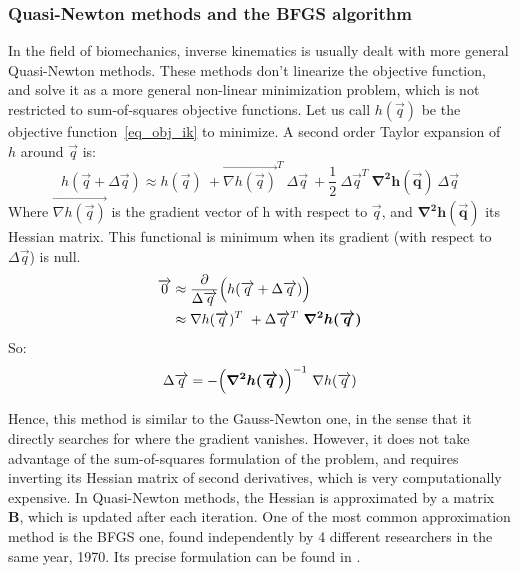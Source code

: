 \subsubsection{Quasi-Newton methods and the BFGS algorithm}

In the field of biomechanics, inverse kinematics is usually dealt with more general Quasi-Newton methods. These methods don't linearize the objective function, and solve it as a more general non-linear minimization problem, which is not restricted to sum-of-squares objective functions. 
Let us call $h(\overrightarrow{q})$ be the objective function~\ref{eq_obj_ik} to minimize. A second order Taylor expansion of $h$ around $\overrightarrow{q}$ is:
\begin{equation}
      h(\overrightarrow{q}+\Delta\overrightarrow{q}) 
      \approx h(\overrightarrow{q}) \ 
      + \overrightarrow{\nabla h(\overrightarrow{q})}^T  \ \Delta\overrightarrow{q} \ 
      + \frac{1}{2}  \ \Delta\overrightarrow{q}^T \ \bm{\nabla^2 h(\overrightarrow{q})}  \ \Delta\overrightarrow{q}
\end{equation} 
Where $\overrightarrow{\nabla h(\overrightarrow{q})}$ is the gradient vector of h with respect to $\overrightarrow{q}$, and $\bm{\nabla^2 h(\overrightarrow{q})}$ its Hessian matrix. This functional is minimum when its gradient (with respect to $\Delta\overrightarrow{q}$) is null.
\begin{equation}
    \begin{aligned}
      \overrightarrow{0} &\approx 
      \frac{\partial}{\Delta \overrightarrow{q}}
      \Bigl( h(\overrightarrow{q}+\Delta\overrightarrow{q}) \Bigr) \\
      &\approx
      \nabla h(\overrightarrow{q})^T  \  
      + \Delta\overrightarrow{q}^T \ \bm{\nabla^2 h(\overrightarrow{q})}
    \end{aligned}
\end{equation} 
So:
\begin{equation}
    \Delta\overrightarrow{q}
    = - \Bigl( \bm{\nabla^2 h(\overrightarrow{q})}\Bigr)^{-1} \ \nabla h(\overrightarrow{q})
\end{equation}      

Hence, this method is similar to the Gauss-Newton one, in the sense that it directly searches for where the gradient vanishes. However, it does not take advantage of the sum-of-squares formulation of the problem, and requires inverting its Hessian matrix of second derivatives, which is very computationally expensive. In Quasi-Newton methods, the Hessian is approximated by a matrix \textbf{B}, which is updated after each iteration. One of the most common approximation method is the BFGS one, found independently by 4 different researchers in the same year, 1970. Its precise formulation can be found in \cite{Nocedal1999}.

